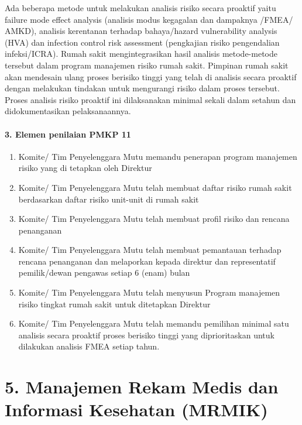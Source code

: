\documentclass[
]{book}
\providecommand{\tightlist}{%
  \setlength{\itemsep}{0pt}\setlength{\parskip}{0pt}}
\begin{document}
Ada beberapa metode untuk melakukan analisis risiko secara proaktif yaitu failure mode effect analysis (analisis modus kegagalan dan dampaknya /FMEA/ AMKD), analisis kerentanan terhadap bahaya/hazard vulnerability analysis (HVA) dan infection control risk assessment (pengkajian risiko pengendalian infeksi/ICRA). Rumah sakit mengintegrasikan hasil analisis metode-metode tersebut dalam program manajemen risiko rumah sakit. Pimpinan rumah sakit akan mendesain ulang proses berisiko tinggi yang telah di analisis secara proaktif dengan melakukan tindakan untuk mengurangi risiko dalam proses tersebut. Proses analisis risiko proaktif ini dilaksanakan minimal sekali dalam setahun dan didokumentasikan pelaksanaannya.

\hypertarget{elemen-penilaian-pmkp-11}{%
\paragraph*{3. Elemen penilaian PMKP 11}\label{elemen-penilaian-pmkp-11}}

\begin{enumerate}
\def\labelenumi{\alph{enumi}.}
\tightlist
\item
  Komite/ Tim Penyelenggara Mutu memandu penerapan program manajemen risiko yang di tetapkan oleh Direktur
\item
  Komite/ Tim Penyelenggara Mutu telah membuat daftar risiko rumah sakit berdasarkan daftar risiko unit-unit di rumah sakit
\item
  Komite/ Tim Penyelenggara Mutu telah membuat profil risiko dan rencana penanganan
\item
  Komite/ Tim Penyelenggara Mutu telah membuat pemantauan terhadap rencana penanganan dan melaporkan kepada direktur dan representatif pemilik/dewan pengawas setiap 6 (enam) bulan
\item
  Komite/ Tim Penyelenggara Mutu telah menyusun Program manajemen risiko tingkat rumah sakit untuk ditetapkan Direktur
\item
  Komite/ Tim Penyelenggara Mutu telah memandu pemilihan minimal satu analisis secara proaktif proses berisiko tinggi yang diprioritaskan untuk dilakukan analisis FMEA setiap tahun.
\end{enumerate}

\hypertarget{manajemen-rekam-medis-dan-informasi-kesehatan-mrmik}{%
\section*{5. Manajemen Rekam Medis dan Informasi Kesehatan (MRMIK)}\label{manajemen-rekam-medis-dan-informasi-kesehatan-mrmik}}
\end{document}
